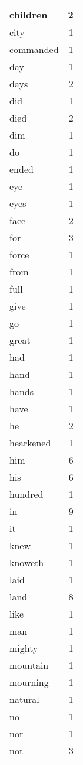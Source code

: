 \begin{center}
\begin{longtable}{l|r}
children & 2 \\ \hline
city & 1 \\ \hline
commanded & 1 \\ \hline
day & 1 \\ \hline
days & 2 \\ \hline
did & 1 \\ \hline
died & 2 \\ \hline
dim & 1 \\ \hline
do & 1 \\ \hline
ended & 1 \\ \hline
eye & 1 \\ \hline
eyes & 1 \\ \hline
face & 2 \\ \hline
for & 3 \\ \hline
force & 1 \\ \hline
from & 1 \\ \hline
full & 1 \\ \hline
give & 1 \\ \hline
go & 1 \\ \hline
great & 1 \\ \hline
had & 1 \\ \hline
hand & 1 \\ \hline
hands & 1 \\ \hline
have & 1 \\ \hline
he & 2 \\ \hline
hearkened & 1 \\ \hline
him & 6 \\ \hline
his & 6 \\ \hline
hundred & 1 \\ \hline
in & 9 \\ \hline
it & 1 \\ \hline
knew & 1 \\ \hline
knoweth & 1 \\ \hline
laid & 1 \\ \hline
land & 8 \\ \hline
like & 1 \\ \hline
man & 1 \\ \hline
mighty & 1 \\ \hline
mountain & 1 \\ \hline
mourning & 1 \\ \hline
natural & 1 \\ \hline
no & 1 \\ \hline
nor & 1 \\ \hline
not & 3 \\ \hline

\end{longtable}
\end{center}
